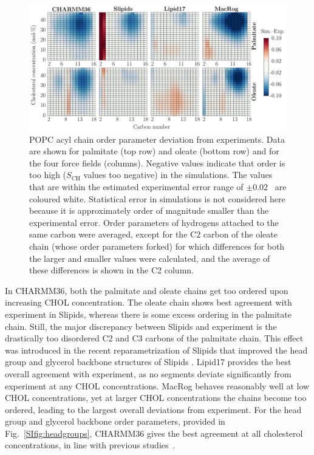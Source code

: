\documentclass[journal=jctcce]{achemso}
\begin{document}
\begin{figure}[htb!]
  \centering
  \includegraphics[width=\linewidth]{../FIGS/OP_chains.pdf}
  \caption{\label{fig:OPmaps}%
  POPC acyl chain order parameter deviation from experiments. Data are shown for palmitate (top row) and oleate (bottom row) and for the four force fields (columns). Negative values indicate that order is too high ($S_\mathrm{CH}$ values too negative) in the simulations. The values that are within the estimated experimental error range of $\pm$0.02~\cite{ollila16} are coloured white. Statistical error in simulations is not considered here because it is approximately order of magnitude smaller than the experimental error. Order parameters of hydrogens attached to the same carbon were averaged, except for the C2 carbon of the oleate chain (whose order parameters forked) for which differences for both the larger and smaller values were calculated, and the average of these differences is shown in the C2 column.
  }
\end{figure}

In CHARMM36, both the palmitate and oleate chains get too ordered upon increasing CHOL concentration. The oleate chain shows best agreement with experiment in Slipids, whereas there is some excess ordering in the palmitate chain. Still, the major discrepancy between Slipids and experiment is the drastically too disordered C2 and C3 carbons of the palmitate chain. This effect was introduced in the recent reparametrization of Slipids that improved the head group and glycerol backbone structures of Slipids \cite{grote2020optimization}. Lipid17 provides the best overall agreement with experiment, as no segments deviate significantly from experiment at any CHOL concentrations. MacRog behaves reasonably well at low CHOL concentrations, yet at larger CHOL concentrations the chains become too ordered, leading to the largest overall deviations from experiment. For the head group and glycerol backbone order parameters, provided in Fig.~\ref{SIfig:headgroups}, CHARMM36 gives the best agreement at all cholesterol concentrations, in line with previous studies~\cite{botan15,antila22b}.
\end{document}
